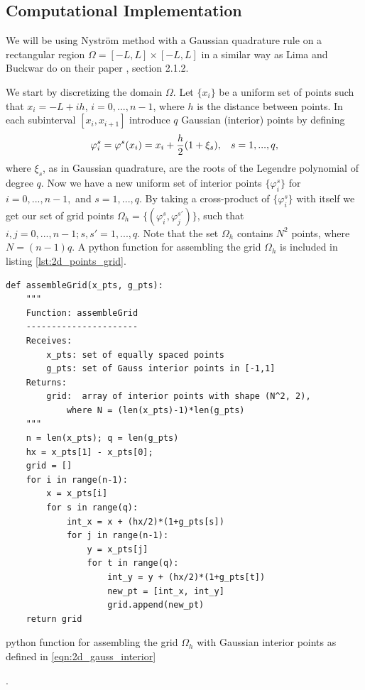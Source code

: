 \documentclass{uonmathreport}
\begin{document}
\subsection{Computational Implementation}\label{subsec:2d_comp_implementation}
We will be using Nystr\"om method with a Gaussian quadrature rule on a rectangular region $\Omega = [-L, L] \times [-L, L]$ in a similar way as Lima and Buckwar do on their paper \cite{lima2015numerical}, section 2.1.2.

We start by discretizing the domain $\Omega$. Let $\{x_i\}$ be a uniform set of points such that $x_i = -L + ih$, $i=0,...,n-1$, where $h$ is the distance between points. In each subinterval $[x_i, x_{i+1}]$ introduce $q$ Gaussian (interior) points by defining
\begin{equation}\label{eqn:2d_gauss_interior}
	\varphi_i^s = \varphi^s(x_i) = x_i + \frac{h}{2}(1 + \xi_s), \hspace{3mm} s = 1,...,q,
\end{equation}
where $\xi_s$, as in Gaussian quadrature, are the roots of the Legendre polynomial of degree $q$. Now we have a new uniform set of interior points  $\{\varphi_i^{s}\}$ for $i=0,...,n-1,$ and $s=1,...,q$. By taking a cross-product of $\{\varphi_i^s\}$ with itself we get our set of grid points $\Omega_h = \{(\varphi_i^s, \varphi_j^{s'})\}$, such that $i,j = 0,...,n-1; s,s' = 1,...,q$. Note that the set $\Omega_h$ contains $N^2$ points, where $N=(n-1)q$. A python function for assembling the grid $\Omega_h$ is included in listing \ref{lst:2d_points_grid}.\\
\begin{listing}[H]
	\begin{center}
		\begin{verbatim}
def assembleGrid(x_pts, g_pts):
	"""
	Function: assembleGrid
	----------------------
	Receives:
		x_pts: set of equally spaced points
		g_pts: set of Gauss interior points in [-1,1]
	Returns:
		grid:  array of interior points with shape (N^2, 2), 
			where N = (len(x_pts)-1)*len(g_pts)
	"""
	n = len(x_pts); q = len(g_pts)
	hx = x_pts[1] - x_pts[0]; 
	grid = []
	for i in range(n-1):
		x = x_pts[i]
		for s in range(q):
			int_x = x + (hx/2)*(1+g_pts[s])
			for j in range(n-1):
				y = x_pts[j]
				for t in range(q):
					int_y = y + (hx/2)*(1+g_pts[t])
					new_pt = [int_x, int_y]
					grid.append(new_pt)
	return grid
		\end{verbatim}	
	\end{center}
	\caption{python function for assembling the grid $\Omega_h$ with Gaussian interior points as defined in \ref{eqn:2d_gauss_interior}}
	\label{lst:2d_points_grid}.
\end{listing} 
\end{document}
